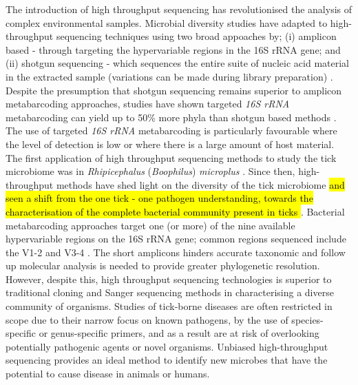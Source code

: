 \documentclass[a4paper, nobind]{templates/ociamthesis}
\begin{document}
The introduction of high throughput sequencing has revolutionised the analysis of complex environmental samples.
Microbial diversity studies have adapted to high-throughput sequencing techniques using two broad appoaches by; (i) amplicon based - through targeting the hypervariable regions in the 16S rRNA gene; and (ii) shotgun sequencing - which sequences the entire suite of nucleic acid material in the extracted sample (variations can be made during library preparation) \autocite{liuPracticalGuideAmplicon2020,bhartiCurrentChallengesBestpractice2021}.
Despite the presumption that shotgun sequencing remains superior to amplicon metabarcoding approaches, studies have shown targeted \emph{16S rRNA} metabarcoding can yield up to 50\% more phyla than shotgun based methods \autocite{tesslerLargescaleDifferencesMicrobial2017}.
The use of targeted \emph{16S rRNA} metabarcoding is particularly favourable where the level of detection is low or where there is a large amount of host material.
The first application of high throughput sequencing methods to study the tick microbiome was in \emph{Rhipicephalus} (\emph{Boophilus}) \emph{microplus} \autocite{andreottiAssessmentBacterialDiversity2011}.
Since then, high-throughput methods have shed light on the diversity of the tick microbiome \autocite{greayRecentInsightsTick2018} \hl{and seen a shift from the one tick - one pathogen understanding, towards the characterisation of the complete bacterial community present in ticks \autocite{moutaillerCoinfectionTicksRule2016}}.
Bacterial metabarcoding approaches target one (or more) of the nine available hypervariable regions on the 16S rRNA gene; common regions sequenced include the V1-2 and V3-4 \autocite{barbDevelopmentAnalysisPipeline2016,yangSensitivityCorrelationHypervariable2016,sperlingComparisonBacterial16S2017}.
The short amplicons hinders accurate taxonomic and follow up molecular analysis is needed to provide greater phylogenetic resolution.
However, despite this, high throughput sequencing technologies is superior to traditional cloning and Sanger sequencing methods in characterising a diverse community of organisms.
Studies of tick-borne diseases are often restricted in scope due to their narrow focus on known pathogens, by the use of species-specific or genus-specific primers, and as a result are at risk of overlooking potentially pathogenic agents or novel organisms.
Unbiased high-throughput sequencing provides an ideal method to identify new microbes that have the potential to cause disease in animals or humans.
\end{document}

